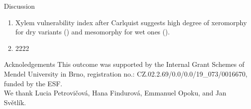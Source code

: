 \documentclass[final]{beamer}
\newlength{\sepwidth}
\newlength{\colwidth}
\newcommand{\separatorcolumn}{\begin{column}{\sepwidth}\end{column}}
\begin{document}
\begin{frame}[t]
\begin{columns}[t]
\begin{column}{\colwidth}
\end{column}
\end{columns}

\begin{columns}[c]
\begin{column}{0.96\paperwidth}

\begin{block}{Discussion}
    \begin{enumerate}
        \item Xylem vulnerability index after Carlquist \parencite{carlquist1977} suggests high degree of xeromorphy for dry variants () and mesomorphy for wet ones ().
        \item 2222
    \end{enumerate}

\footnotesize \printbibliography
\end{block}

\vfill

\begin{block}{Acknoledgements}
\small \centering
    This outcome was supported by the Internal Grant Schemes of Mendel University in Brno, registration no.: CZ.02.2.69/0.0/0.0/19\_073/0016670, funded by the ESF. \\
    We thank Lucia Petrovičová, Hana Findurová, Emmanuel Opoku, and Jan Světlík.
\end{block}

\end{column}
%
%
\end{columns}
\end{frame}
\end{document}
